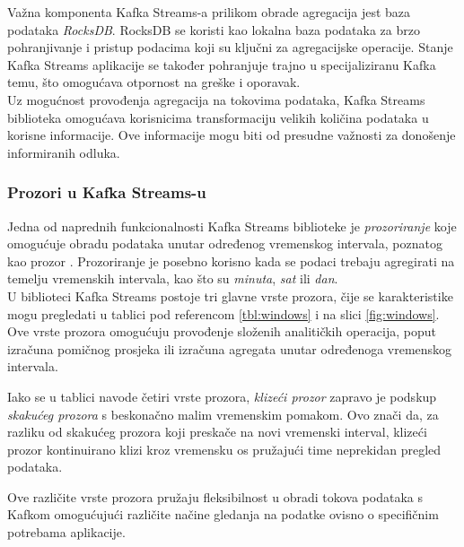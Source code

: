 \documentclass[times, utf8, diplomski]{fer}
\begin{document}
Važna komponenta Kafka Streams-a prilikom obrade agregacija jest baza podataka \emph{RocksDB}. RocksDB se koristi kao lokalna baza podataka za brzo pohranjivanje i pristup podacima koji su ključni za agregacijske operacije. Stanje Kafka Streams aplikacije se također pohranjuje trajno u specijaliziranu Kafka temu, što omogućava otpornost na greške i oporavak.\\

Uz mogućnost provođenja agregacija na tokovima podataka, Kafka Streams biblioteka omogućava korisnicima transformaciju velikih količina podataka u korisne informacije. Ove informacije mogu biti od presudne važnosti za donošenje informiranih odluka.

\subsubsection{Prozori u Kafka Streams-u}

Jedna od naprednih funkcionalnosti Kafka Streams biblioteke je \emph{prozoriranje}  koje omogućuje obradu podataka unutar određenog vremenskog intervala, poznatog kao prozor . Prozoriranje je posebno korisno kada se podaci trebaju agregirati na temelju vremenskih intervala, kao što su \emph{minuta}, \emph{sat} ili \emph{dan}.\\

U biblioteci Kafka Streams postoje tri glavne vrste prozora, čije se karakteristike mogu pregledati u tablici pod referencom \ref{tbl:windows} i na slici \ref{fig:windows}. Ove vrste prozora omogućuju provođenje složenih analitičkih operacija, poput izračuna pomičnog prosjeka ili izračuna agregata unutar određenoga vremenskog intervala.

Iako se u tablici navode četiri vrste prozora, \emph{klizeći prozor}  zapravo je podskup \emph{skakućeg prozora}  s beskonačno malim vremenskim pomakom. Ovo znači da, za razliku od skakućeg prozora koji \glqq preskače\grqq\hspace{1pt} na novi vremenski interval, klizeći prozor kontinuirano \glqq klizi\grqq\hspace{1pt}  kroz vremensku os pružajući time neprekidan pregled podataka.

Ove različite vrste prozora pružaju fleksibilnost u obradi tokova podataka s Kafkom omogućujući različite načine gledanja na podatke ovisno o specifičnim potrebama aplikacije.
\end{document}
